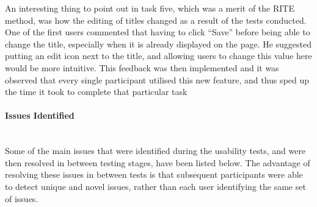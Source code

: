 \newpage
\noindent
An interesting thing to point out in task five, which was a merit of the RITE method, was how the editing of titles changed as a result of the tests conducted. One of the first users commented that having to click ``Save'' before being able to change the title, especially when it is already displayed on the page. He suggested putting an edit icon next to the title, and allowing users to change this value here would be more intuitive. This feedback was then implemented and it was observed that every single participant utilised this new feature, and thus sped up the time it took to complete that particular task

\paragraph{Issues Identified}\ \\
Some of the main issues that were identified during the usability tests, and were then resolved in between testing stages, have been listed below. The advantage of resolving these issues in between tests is that subsequent participants were able to detect unique and novel issues, rather than each user identifying the same set of issues.
\ \\
\ \\
\noindent 
